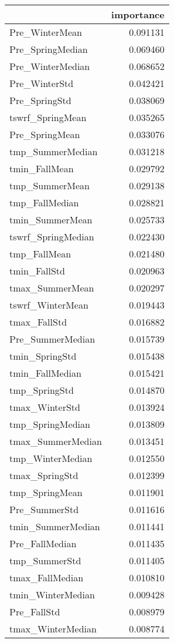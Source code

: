 \begin{tabular}{lr}
\toprule
 & importance \\
\midrule
Pre_WinterMean & 0.091131 \\
Pre_SpringMedian & 0.069460 \\
Pre_WinterMedian & 0.068652 \\
Pre_WinterStd & 0.042421 \\
Pre_SpringStd & 0.038069 \\
tswrf_SpringMean & 0.035265 \\
Pre_SpringMean & 0.033076 \\
tmp_SummerMedian & 0.031218 \\
tmin_FallMean & 0.029792 \\
tmp_SummerMean & 0.029138 \\
tmp_FallMedian & 0.028821 \\
tmin_SummerMean & 0.025733 \\
tswrf_SpringMedian & 0.022430 \\
tmp_FallMean & 0.021480 \\
tmin_FallStd & 0.020963 \\
tmax_SummerMean & 0.020297 \\
tswrf_WinterMean & 0.019443 \\
tmax_FallStd & 0.016882 \\
Pre_SummerMedian & 0.015739 \\
tmin_SpringStd & 0.015438 \\
tmin_FallMedian & 0.015421 \\
tmp_SpringStd & 0.014870 \\
tmax_WinterStd & 0.013924 \\
tmp_SpringMedian & 0.013809 \\
tmax_SummerMedian & 0.013451 \\
tmp_WinterMedian & 0.012550 \\
tmax_SpringStd & 0.012399 \\
tmp_SpringMean & 0.011901 \\
Pre_SummerStd & 0.011616 \\
tmin_SummerMedian & 0.011441 \\
Pre_FallMedian & 0.011435 \\
tmp_SummerStd & 0.011405 \\
tmax_FallMedian & 0.010810 \\
tmin_WinterMedian & 0.009428 \\
Pre_FallStd & 0.008979 \\
tmax_WinterMedian & 0.008774 \\

\end{tabular}

